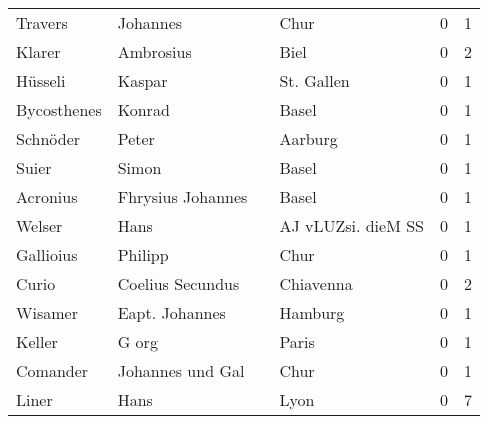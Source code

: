 \begin{center}
\begin{tiny}
\begin{longtabu}{llllrr}
                  Travers &                           Johannes &             &                                        Chur &          0 &         1 \\
                   Klarer &                          Ambrosius &             &                                        Biel &          0 &         2 \\
                  Hüsseli &                             Kaspar &             &                                  St. Gallen &          0 &         1 \\
              Bycosthenes &                             Konrad &             &                                       Basel &          0 &         1 \\
                 Schnöder &                              Peter &             &                                     Aarburg &          0 &         1 \\
                    Suier &                              Simon &             &                                       Basel &          0 &         1 \\
                 Acronius &                  Fhrysius Johannes &             &                                       Basel &          0 &         1 \\
                   Welser &                               Hans &             &                          AJ vLUZsi. dieM SS &          0 &         1 \\
                Gallioius &                            Philipp &             &                                        Chur &          0 &         1 \\
                    Curio &                   Coelius Secundus &             &                                   Chiavenna &          0 &         2 \\
                  Wisamer &                     Eapt. Johannes &             &                                     Hamburg &          0 &         1 \\
                   Keller &                              G org &             &                                       Paris &          0 &         1 \\
                 Comander &                   Johannes und Gal &             &                                        Chur &          0 &         1 \\
                    Liner &                               Hans &             &                                        Lyon &          0 &         7 \\

\end{longtabu}
\end{tiny}
\end{center}
